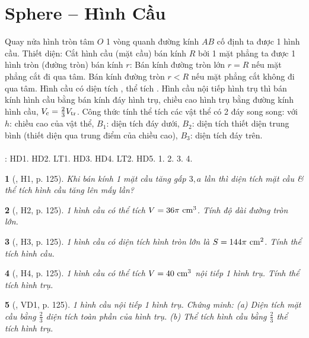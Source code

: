 \documentclass{article}
\newtheorem{baitoan}{}
\begin{document}
\section{Sphere -- Hình Cầu}
 Quay nửa hình tròn tâm $O$ 1 vòng quanh đường kính $AB$ cố định ta được 1 hình cầu.  {\sf Thiết diện}: Cắt hình cầu (mặt cầu) bán kính $R$ bởi 1 mặt phẳng ta được 1 hình tròn (đường tròn) bán kính $r$: Bán kính đường tròn lớn $r = R$ nếu mặt phẳng cắt đi qua tâm. Bán kính đường tròn $r < R$ nếu mặt phẳng cắt không đi qua tâm.  Hình cầu có diện tích , thể tích .  Hình cầu nội tiếp hình trụ thì bán kính hình cầu bằng bán kính đáy hình trụ, chiều cao hình trụ bằng đường kính hình cầu, $V_{\rm c} = \frac{2}{3}V_{\rm tr}$.  {\sf Công thức tính thể tích các vật thể có 2 đáy song song}:  với $h$: chiều cao của vật thể, $B_1$: diện tích đáy dưới, $B_2$: diện tích thiết diện trung bình (thiết diện qua trung điểm của chiều cao), $B_3$: diện tích đáy trên.\\
\\
\cite[Chap. X, \S3, pp. 104--108]{SGK_Toan_9_Canh_Dieu_tap_1}: HD1. HD2. LT1. HD3. HD4. LT2. HD5. 1. 2. 3. 4.

\begin{baitoan}[\cite{Binh_boi_duong_Toan_9_tap_2}, H1, p. 125]
	Khi bán kính 1 mặt cầu tăng gấp $3,a$ lần thì diện tích mặt cầu \& thể tích hình cầu tăng lên mấy lần?
\end{baitoan}

\begin{baitoan}[\cite{Binh_boi_duong_Toan_9_tap_2}, H2, p. 125]
	1 hình cầu có thể tích $V = 36\pi\ {\rm cm}^3$. Tính độ dài đường tròn lớn.
\end{baitoan}

\begin{baitoan}[\cite{Binh_boi_duong_Toan_9_tap_2}, H3, p. 125]
	1 hình cầu có diện tích hình tròn lớn là $S = 144\pi\ {\rm cm}^2$. Tính thể tích hình cầu.
\end{baitoan}

\begin{baitoan}[\cite{Binh_boi_duong_Toan_9_tap_2}, H4, p. 125]
	1 hình cầu có thể tích $V = 40\ {\rm cm}^3$ nội tiếp 1 hình trụ. Tính thể tích hình trụ.
\end{baitoan}

\begin{baitoan}[\cite{Binh_boi_duong_Toan_9_tap_2}, VD1, p. 125]
	1 hình cầu nội tiếp 1 hình trụ. Chứng minh: (a) Diện tích mặt cầu bằng $\frac{2}{3}$ diện tích toàn phần của hình trụ. (b) Thể tích hình cầu bằng $\frac{2}{3}$ thể tích hình trụ.
\end{baitoan}
\end{document}
